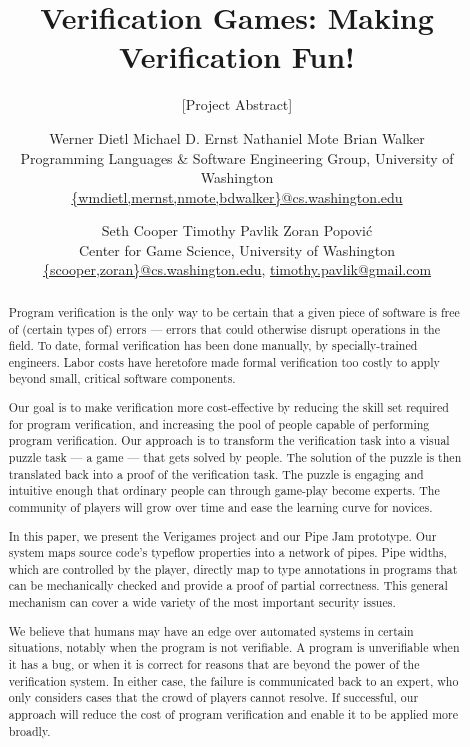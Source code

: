 \documentclass{sig-alternate}
\begin{document}
\title{Verification Games: Making Verification Fun!}

\subtitle{[Project Abstract]}


%
\author{
Werner Dietl
\qquad
Michael D. Ernst
\qquad
Nathaniel Mote
\qquad
Brian Walker\\
%
{\normalsize
Programming Languages \& Software Engineering Group,
University of Washington}\\
\url{{wmdietl,mernst,nmote,bdwalker}@cs.washington.edu}
%
\and
%
Seth Cooper
\qquad
Timothy Pavlik
\qquad
Zoran Popovi\'c\\
%
{\normalsize
Center for Game Science, University of Washington}\\
\url{{scooper,zoran}@cs.washington.edu},
\url{timothy.pavlik@gmail.com}
}

\date{}

\maketitle

\begin{abstract}
Program verification is the only way to be certain that a given
piece of software is free of (certain types of) errors --- errors that
could otherwise disrupt operations in the field.  To date, formal
verification has been done manually, by specially-trained engineers.  Labor
costs have heretofore made formal verification too costly to apply beyond
small, critical software components.

Our goal is to make verification more cost-effective by reducing the skill
set required for program verification, and increasing the pool of people
capable of performing program verification.  Our approach is to transform
the verification task into a visual puzzle task --- a game --- that
gets solved by people. The solution of the puzzle is then translated
back into a proof of the verification task.
The puzzle is engaging and intuitive enough that ordinary people can through
game-play become experts.  The community of players will grow over
time and ease the learning curve for novices.

In this paper, we present the Verigames project and our
Pipe Jam prototype.  Our system maps source code's typeflow properties
into a network of pipes.
Pipe widths, which are controlled by the player, directly map to type
annotations in programs that can be mechanically checked and provide a
proof of partial correctness.
This general mechanism can cover a wide variety of the most important
security issues.

We believe that humans may have an edge over automated systems in
certain situations, notably when the program is not verifiable.  A
program is unverifiable when it has a bug, or when it is correct for
reasons that are beyond the power of the verification system.  In
either case, the failure is communicated back to an expert, who only
considers cases that the crowd of players cannot resolve.
%
If successful, our approach will reduce the cost of program verification
and enable it to be applied more broadly.


\end{abstract}
\end{document}
